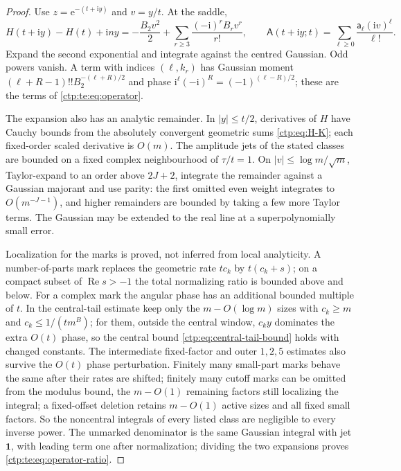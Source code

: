 \documentclass[11pt,a4paper]{article}
\numberwithin{equation}{section}
\theoremstyle{definition}
\theoremstyle{remark}
\newcommand{\ii}{\mathrm i}
\newcommand{\e}{\mathrm e}
\DeclareMathOperator{\Rea}{Re}
\newcommand{\amp}{\mathsf A}
\begin{document}
\begin{proof}
Use $z=\e^{-(t+\ii y)}$ and $v=y/t$. At the saddle,
\begin{equation}\label{ctp:te:eq:gaussian-exp}
 H(t+\ii y)-H(t)+\ii ny=-\frac{B_2v^2}2+\sum_{r\ge3}\frac{(-\ii)^rB_rv^r}{r!},
 \qquad
 \amp(t+\ii y;t)=\sum_{\ell\ge0}\frac{\mathsf a_\ell(\ii v)^\ell}{\ell!}.
\end{equation}
Expand the second exponential and integrate against the centred Gaussian.
Odd powers vanish. A term with indices $(\ell,k_r)$ has Gaussian moment
$(\ell+R-1)!!B_2^{-(\ell+R)/2}$ and phase $\ii^\ell(-\ii)^R=(-1)^{(\ell-R)/2}$;
these are the terms of \eqref{ctp:te:eq:operator}.

The expansion also has an analytic remainder. In $|y|\le t/2$, derivatives
of $H$ have Cauchy bounds from the absolutely convergent geometric sums
\eqref{ctp:eq:H-K}; each fixed-order scaled derivative is $O(m)$. The
amplitude jets of the stated classes are bounded on a fixed complex
neighbourhood of $\tau/t=1$. On $|v|\le\log m/\sqrt m$, Taylor-expand to an
order above $2J+2$, integrate the remainder against a Gaussian majorant and
use parity: the first omitted even weight integrates to $O(m^{-J-1})$, and
higher remainders are bounded by taking a few more Taylor terms. The
Gaussian may be extended to the real line at a superpolynomially small
error.

Localization for the marks is proved, not inferred from local analyticity.
A number-of-parts mark replaces the geometric rate $tc_k$ by $t(c_k+s)$;
on a compact subset of $\Rea s>-1$ the total normalizing ratio is bounded
above and below. For a complex mark the angular phase has an additional
bounded multiple of $t$. In the central-tail estimate keep only the
$m-O(\log m)$ sizes with $c_k\ge m$ and $c_k\le1/(tm^B)$; for them, outside
the central window, $c_ky$ dominates the extra $O(t)$ phase, so the central
bound \eqref{ctp:eq:central-tail-bound} holds with changed constants. The
intermediate fixed-factor and outer $1,2,5$ estimates also survive the
$O(t)$ phase perturbation. Finitely many small-part marks behave the same
after their rates are shifted; finitely many cutoff marks can be omitted
from the modulus bound, the $m-O(1)$ remaining factors still localizing the
integral; a fixed-offset deletion retains $m-O(1)$ active sizes and all
fixed small factors. So the noncentral integrals of every listed class are
negligible to every inverse power. The unmarked denominator is the same
Gaussian integral with jet $\mathbf1$, with leading term one after
normalization; dividing the two expansions proves
\eqref{ctp:te:eq:operator-ratio}.
\end{proof}
\end{document}

